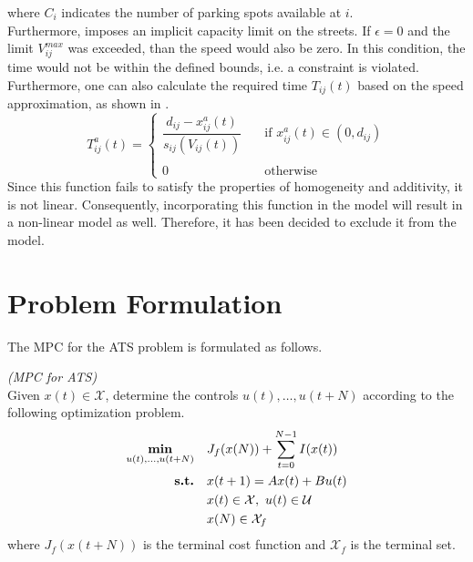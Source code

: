 where $C_i$ indicates the number of parking spots available at $i$. \\
Furthermore,  imposes an implicit capacity limit on the streets. If $\epsilon=0$ and the limit $V^{max}_{ij}$ was exceeded, than the speed would also be zero. In this condition, the time would not be within the defined bounds, i.e. a constraint is violated. \\
Furthermore, one can also calculate the required time $T_{ij}(t)$ based on the speed approximation, as shown in . 
\begin{equation}
	T_{ij}^a(t) = \begin{cases}
			\dfrac{d_{ij} - x^a_{ij}(t)}{s_{ij}(V_{ij}(t))} &\quad \text{if } x_{ij}^a(t) \in (0,d_{ij})\\
			&\\
			0 &\quad\text{otherwise }
		\end{cases}
	\label{eq:required_time} 
\end{equation}
Since this function fails to satisfy the properties of homogeneity and additivity, it is not linear. Consequently, incorporating this function in the model will result in a non-linear model as well. Therefore, it has been decided to exclude it from the model.

\section{Problem Formulation}\label{sec:prob_formulat_mpc}
The MPC for the ATS problem is formulated as follows. \\
\begin{definition}{\textit{(MPC for ATS) \\}}
	Given $x(t) \in \mathcal{X}$, determine the controls $u(t), \dots, u(t+N)$ according to the following optimization problem.
	\begin{equation}
		\begin{aligned}
			\underset{\substack{u(t), \dots, u(t+N)}}{\text{\textbf{min}}} \quad & J_f(x(N))+\sum_{t=0}^{N-1}I(x(t)) \\
			\text{\textbf{s.t.}} \quad & x(t+1) = Ax(t) + Bu(t)  \\
			& x(t) \in \mathcal{X}, \ u(t)\in \mathcal{U} \\
			&x(N) \in \mathcal{X}_f\\
		\end{aligned}
		\label{eq:mpc_ats}
	\end{equation}
	where $J_f(x(t+N))$ is the terminal cost function and $\mathcal{X}_f$ is the terminal set. \\
\end{definition}


